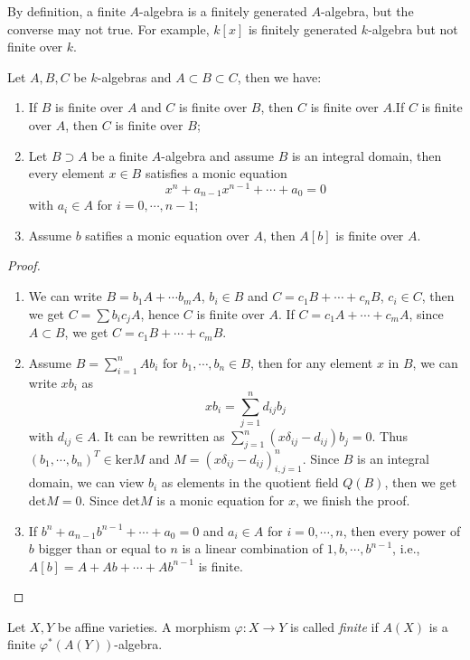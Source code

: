 By definition, a finite $ A $-algebra is a finitely generated $ A $-algebra, but the converse may not true. For example, $ k[x] $ is finitely generated $ k $-algebra but not finite over $ k $.
\begin{proposition}
	Let $ A,B,C $ be $ k $-algebras and $ A\subset B\subset C $, then we have:
	\begin{enumerate}
		\item If $ B $ is finite over $ A $ and $ C $ is finite over $ B $, then $ C $ is finite over $ A $.If $ C $ is finite over $ A $, then $ C $ is finite over $ B $;
		\item Let $ B\supset A $ be a finite $ A $-algebra and assume $ B $ is an integral domain, then every element  $ x\in B $ satisfies a monic equation
		      $$
			      x^n+a_{n-1}x^{n-1}+\cdots+a_0=0
		      $$
		      with $ a_i\in A $ for $ i=0,\cdots,n-1 $;
		\item Assume $ b $ satifies a monic equation over $ A $, then $ A[b] $ is finite over $ A $.
	\end{enumerate}
\end{proposition}
\begin{proof}
	\begin{enumerate}
		\item  We can write $ B=b_1A+\cdots b_mA $, $ b_i\in B $ and $ C=c_1B+\cdots+c_nB $, $ c_i\in C $, then we get $ C=\sum b_ic_j A $, hence $ C $ is finite over $ A $. If $ C=c_1A+\cdots+c_mA $, since $ A\subset B $, we get $ C=c_1B+\cdots+c_mB $.
		\item Assume $ B=\sum\limits_{i=1}^{n}Ab_i $ for $ b_1,\cdots,b_n\in B $, then for any element $ x $ in $ B $, we can write $ xb_i $ as
		      $$
			      xb_i=\sum\limits_{j=1}^{n}d_{ij}b_j
		      $$
		      with $ d_{ij}\in A $. It can be rewritten as
		      $ \sum\limits_{j=1}^{n}(x\delta_{ij}-d_{ij})b_j=0 $. Thus $ (b_1,\cdots,b_n)^{T}\in \text{ker}M $ and $ M=(x\delta_{ij}-d_{ij})_{i,j=1}^{n} $. Since $ B $ is an integral domain, we can view $ b_i $ as elements in the quotient field $ Q(B) $, then we get $ \text{det}M=0 $. Since $ \text{det}M $ is a monic equation for $ x $, we finish the proof.
		\item If $ b^n+a_{n-1}b^{n-1}+\cdots+a_0=0 $ and $ a_i\in A $ for $ i=0,\cdots,n $, then every power of $ b $ bigger than  or equal to $ n $ is a linear combination of $ 1,b,\cdots,b^{n-1} $, i.e., $ A[b]=A+Ab+\cdots +Ab^{n-1} $ is finite.
	\end{enumerate}
\end{proof}
\begin{definition}
	Let $ X,Y $ be affine varieties. A morphism $ \varphi:X\to Y $ is called \textit{finite} if $ A(X) $ is a finite $ \varphi^{\ast}(A(Y)) $-algebra.
\end{definition}

